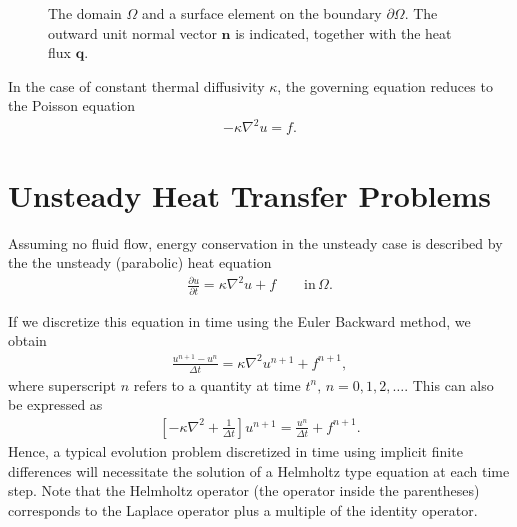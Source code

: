 \begin{figure}
  \centering
  \caption{
    The domain $\Omega$ and a surface element on the boundary
    $\partial\Omega$. The outward unit normal vector ${\bm n}$ is indicated,
    together with the heat flux ${\bm q}$.
  }
  \label{fig:HeatFlux}
\end{figure}

In the case of constant thermal diffusivity $\kappa$, the governing equation
reduces to the Poisson equation
\begin{align}
  \label{steady-heat}
  - \kappa\nabla^2 u = f.
\end{align}

\section {Unsteady Heat Transfer Problems}

Assuming no fluid flow, energy conservation in the unsteady case is described by
the the unsteady (parabolic) heat equation
\begin{align}
  \label{heat-eq}
  \frac{\partial u}{\partial t}
  = \kappa \nabla^2 u + f \qquad \text{in}\,\Omega.
\end{align}

If we discretize this equation in time using the Euler Backward method, we
obtain
\begin{align}
  \frac{u^{n+1}- u^n}{\Delta t}
  = \kappa\nabla^2 u^{n+1} + f^{n+1},
\end{align}
where superscript $n$ refers to a quantity at time $t^n,\, n=0,1,2,\ldots$. This
can also be expressed as
\begin{align}
  \label{helm-eq}
  \left[- \kappa\nabla^2 +\frac{1}{\Delta t} \right] u^{n+1} =
  \frac{u^n}{\Delta t} + f^{n+1}.
\end{align}
Hence, a typical evolution problem discretized in time using implicit finite
differences will necessitate the solution of a Helmholtz type equation at each
time step. Note that the Helmholtz operator (the operator inside the
parentheses) corresponds to the Laplace operator plus a multiple of the identity
operator.

